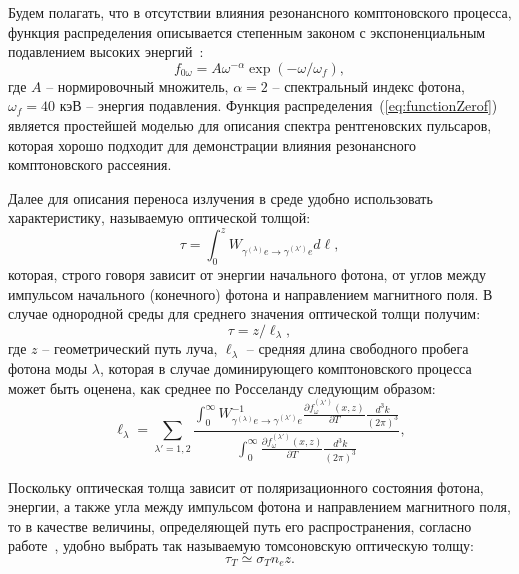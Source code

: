 \documentclass[14pt, russian]{article}
\begin{document}
 Будем полагать, что в отсутствии влияния резонансного комптоновского процесса, функция распределения описывается степенным законом с экспоненциальным подавлением высоких энергий~\cite{Araya:1999,Schonherr:2007,Nishimura:2015,SandeepK:2022}:
\begin{equation}\label{eq:functionZerof}
	f_{0\omega} = A\omega^{-\alpha} \exp(-\omega/\omega_f),
\end{equation}
где $A$ -- нормировочный множитель, $\alpha = 2 $ -- спектральный индекс фотона,   $\omega_f = 40$ кэВ -- энергия подавления. Функция распределения~(\ref{eq:functionZerof})  является простейшей моделью для описания спектра рентгеновских пульсаров, которая хорошо подходит для демонстрации влияния резонансного комптоновского рассеяния.

Далее для описания переноса излучения в среде удобно использовать характеристику, называемую оптической толщой:
\begin{equation}
	\tau = \int_0^z W_{\gamma^{(\lambda)} e \to \gamma^{(\lambda')} e} d\ell,
\end{equation}	
которая, строго говоря зависит от энергии начального фотона, от углов между импульсом начального (конечного) фотона и направлением магнитного поля. 
	В случае однородной среды для среднего значения оптической толщи получим:
\begin{equation}
	\tau = z /\ell_\lambda,
\end{equation}
	где $z$ -- геометрический путь луча, $\ell_\lambda$ -- средняя длина свободного пробега фотона моды $\lambda$, которая в случае доминирующего комптоновского процесса может быть оценена, как среднее по Росселанду следующим образом:
	\begin{equation}\label{eq:l}
		\ell_\lambda =\sum_{\lambda'= 1,2} \frac{\int_0^{\infty} W^{-1}_{\gamma^{(\lambda)} e \to \gamma^{(\lambda')} e} \frac{\partial f_\omega^{(\lambda')}(x,z)}{\partial T} \frac{d^3k}{(2\pi)^3}}{\int_0^\infty\frac{\partial f^{(\lambda')}_\omega(x,z)}{\partial T} \frac{d^3k}{(2\pi)^3}},
	\end{equation}

Поскольку оптическая толща зависит от поляризационного состояния фотона, энергии, а также угла между импульсом фотона и направлением магнитного поля, то в качестве величины, определяющей путь его распространения, согласно работе~\cite{Schonherr:2007}, удобно выбрать так называемую томсоновскую оптическую толщу:
\begin{equation}
	\tau_T \simeq \sigma_T  n_e z.
\end{equation} 
\end{document}
